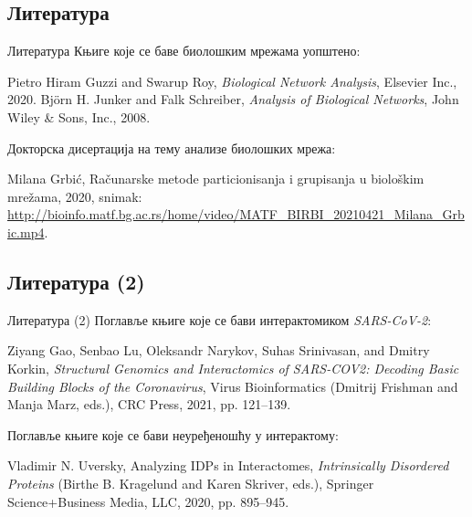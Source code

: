 \documentclass[hyperref={bookmarks=false}]{beamer}
\begin{document}
\subsection{Литература}
\begin{frame}{Литература}
Књиге које се баве биолошким мрежама уопштено:
\begin{thebibliography}{2}
\bibitem{} Pietro Hiram Guzzi and Swarup Roy, \textit{Biological Network Analysis}, Elsevier Inc., 2020.
\bibitem{} Björn H. Junker and Falk Schreiber, \textit{Analysis of Biological Networks}, John Wiley \& Sons, Inc., 2008.
\end{thebibliography}

\bigskip

Докторска дисертација на тему анализе биолошких мрежа:
\begin{thebibliography}{1}
\bibitem{} Milana Grbić, Računarske metode particionisanja i grupisanja u biološkim mrežama, 2020, snimak: \url{http://bioinfo.matf.bg.ac.rs/home/video/MATF_BIRBI_20210421_Milana_Grbic.mp4}.
\end{thebibliography}
\end{frame}

\subsection{Литература (2)}
\begin{frame}{Литература (2)}
Поглавље књиге које се бави интерактомиком \textit{SARS-CoV-2}:
\begin{thebibliography}{1}
\bibitem{} Ziyang Gao, Senbao Lu, Oleksandr Narykov, Suhas Srinivasan, and Dmitry Korkin, \textit{Structural Genomics and Interactomics of SARS-COV2: Decoding Basic Building Blocks of the Coronavirus}, Virus Bioinformatics (Dmitrij Frishman and Manja Marz, eds.), CRC Press, 2021, pp. 121–139.
\end{thebibliography}

\bigskip

Поглавље књиге које се бави неуређеношћу у интерактому:
\begin{thebibliography}{1}
\bibitem{} Vladimir N. Uversky, Analyzing IDPs in Interactomes, \textit{Intrinsically Disordered Proteins} (Birthe B. Kragelund and Karen Skriver, eds.), Springer Science+Business Media, LLC, 2020, pp. 895–945.
\end{thebibliography}
\end{frame}
\end{document}
